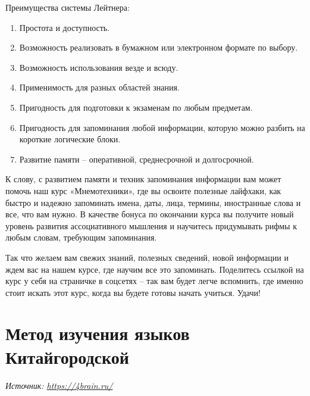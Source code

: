 Преимущества системы Лейтнера:
\begin{enumerate}
    \item Простота и доступность.
    \item Возможность реализовать в бумажном или электронном формате по выбору.
    \item Возможность использования везде и всюду.
    \item Применимость для разных областей знания.
    \item Пригодность для подготовки к экзаменам по любым предметам.
    \item Пригодность для запоминания любой информации, которую можно разбить на короткие логические блоки.
    \item Развитие памяти – оперативной, среднесрочной и долгосрочной.
\end{enumerate}

К слову, с развитием памяти и техник запоминания информации вам может помочь наш курс «Мнемотехники», где вы освоите полезные лайфхаки, как быстро и надежно запоминать имена, даты, лица, термины, иностранные слова и все, что вам нужно. В качестве бонуса по окончании курса вы получите новый уровень развития ассоциативного мышления и научитесь придумывать рифмы к любым словам, требующим запоминания.

Так что желаем вам свежих знаний, полезных сведений, новой информации и ждем вас на нашем курсе, где научим все это запоминать. Поделитесь ссылкой на курс у себя на страничке в соцсетях – так вам будет легче вспомнить, где именно стоит искать этот курс, когда вы будете готовы начать учиться. Удачи!

\clearpage
\section{Метод изучения языков Китайгородской}

\textit{Источник: \url{https://4brain.ru/}}

